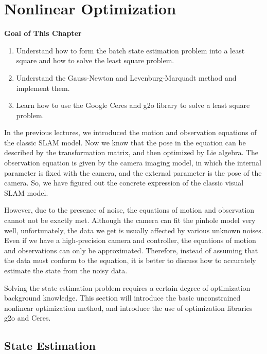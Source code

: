 \chapter{Nonlinear Optimization}
\label{cpt:6}
\begin{mdframed}  
	\textbf{Goal of This Chapter}
	\begin{enumerate}[labelindent=0em,leftmargin=1.5em]
		\item Understand how to form the batch state estimation problem into a least square and how to solve the least square problem.
		\item Understand the Gauss-Newton and Levenburg-Marquadt method and implement them.
		\item Learn how to use the Google Ceres and g2o library to solve a least square problem.
	\end{enumerate}
\end{mdframed} 

In the previous lectures, we introduced the motion and observation equations of the classic SLAM model. Now we know that the pose in the equation can be described by the transformation matrix, and then optimized by Lie algebra. The observation equation is given by the camera imaging model, in which the internal parameter is fixed with the camera, and the external parameter is the pose of the camera. So, we have figured out the concrete expression of the classic visual SLAM model.

However, due to the presence of noise, the equations of motion and observation cannot not be exactly met. Although the camera can fit the pinhole model very well, unfortunately, the data we get is usually affected by various unknown noises. Even if we have a high-precision camera and controller, the equations of motion and observations can only be approximated. Therefore, instead of assuming that the data must conform to the equation, it is better to discuss how to accurately estimate the state from the noisy data.

Solving the state estimation problem requires a certain degree of optimization background knowledge. This section will introduce the basic unconstrained nonlinear optimization method, and introduce the use of optimization libraries g2o and Ceres.

\newpage


\newpage
\section{State Estimation}
